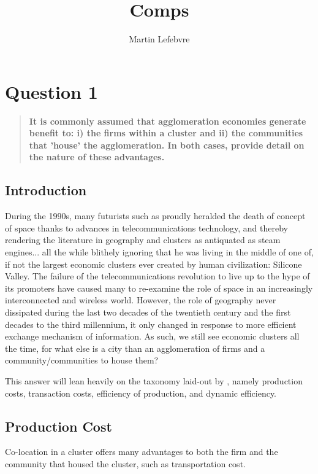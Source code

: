 \documentclass[12pt,letterpaper,notitlepage,onecolumn,final,openbib]{article}
\author{Martin Lefebvre}
\title{Comps}
\begin{document}
	
	\section{Question 1}
	\begin{quotation}
		\textbf{It is commonly assumed that agglomeration economies generate benefit to: i) the firms within a cluster and ii) the communities that 'house' the agglomeration. In both cases, provide detail on the nature of these advantages.}
		
	\end{quotation}
	
	\subsection{Introduction}
	During the 1990s, many futurists such as  proudly heralded the death of concept of space thanks to advances in telecommunications technology, and thereby rendering the literature in geography and clusters as antiquated as steam engines... all the while blithely ignoring that he was living in the middle of one of, if not the largest economic clusters ever created by human civilization: Silicone Valley.   The failure of the telecommunications revolution to live up to the hype of its promoters have caused many to re-examine the role of space in an increasingly interconnected and wireless world.  However, the role of geography never dissipated during the last two decades of the twentieth century and the first decades to the third millennium, it only changed in response to more efficient exchange mechanism of information.  As such, we still see economic clusters all the time, for what else is a city than an agglomeration of firms and a community/communities to house them? 
	
	This answer will lean heavily on the taxonomy laid-out by , namely production costs, transaction costs, efficiency of production, and dynamic efficiency.
	
	\subsection{Production Cost}
	Co-location in a cluster offers many advantages to both the firm and the community that housed the cluster, such as transportation cost.
	
\end{document}
